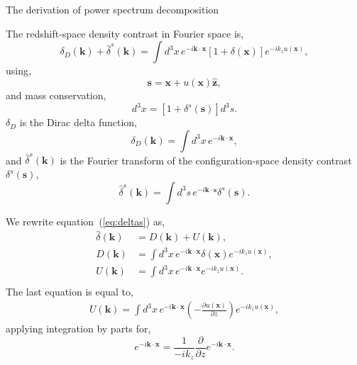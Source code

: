 \documentclass[a4paper,11pt, fleqn]{article}
\begin{document}
%
\newpage
\hypertarget{link:decomposed-power-derivation}{The derivation of power spectrum decomposition}

\vspace{10mm}
The redshift-space density contrast in Fourier space is,
%
\begin{equation}
  \label{eq:deltas}
  \delta_D(\bm{k}) + \hat{\delta}^s(\bm{k}) = \int \! d^3 x \, e^{-i\bm{k}\cdot\bm{x}} [1 + \delta(\bm{x})] e^{-ik_z u(\bm{x})},
\end{equation}
%
using,
%
\begin{equation}
  \bm{s} = \bm{x} + u(\bm{x}) \hat{\bm{z}},
\end{equation}
%
and mass conservation,
%
\begin{equation}
  [1 + \delta(\bm{x})] d^3 x = [1 + \delta^s(\bm{s})] d^3 s.
\end{equation}
%
$\delta_D$ is the Dirac delta function,
%
\begin{equation}
  \delta_D(\bm{k}) = \int\! d^3 x \, e^{-i\bm{k}\cdot\bm{x}},
\end{equation}
and $\hat{\delta}^s(\bm{k})$ is the Fourier transform of the
configuration-space density contrast $\delta^s(\bm{s})$,
%
\begin{equation}
  \hat{\delta}^s(\bm{k}) = \int \! d^3 s \,
                           e^{-i\bm{k}\cdot\bm{s}} \delta^s(\bm{s}).
\end{equation}

\vspace{10mm}
We rewrite equation~(\ref{eq:deltas}) as,
%
\begin{align}
  \hat{\delta}(\bm{k}) &= D(\bm{k}) + U(\bm{k}),\\
  D(\bm{k}) &= \int \! d^3 x \, e^{-i\bm{k}\cdot\bm{x}} \delta(\bm{x})
               e^{-ik_z u(\bm{x})},\\
  U(\bm{k}) &= \int \! d^3 x \, e^{-i\bm{k}\cdot\bm{x}}
                              e^{-ik_z u(\bm{x})}.\\
\end{align}
%
The last equation is equal to,
%
\begin{equation}\begin{split}
  U(\bm{k}) = \int\! d^3 x \, e^{-i \bm{k}\cdot\bm{x}}
              \left( - \frac{\partial u(\bm{x})}{\partial z} \right)
              e^{-ik_z u(\bm{x})},
\end{split}\end{equation}
applying integration by parts for,
\begin{equation}
  e^{-i \bm{k}\cdot\bm{x}} = \frac{1}{-ik_z}
  \frac{\partial}{\partial z} e^{-i \bm{k}\cdot\bm{x}}.
\end{equation}
\end{document}
